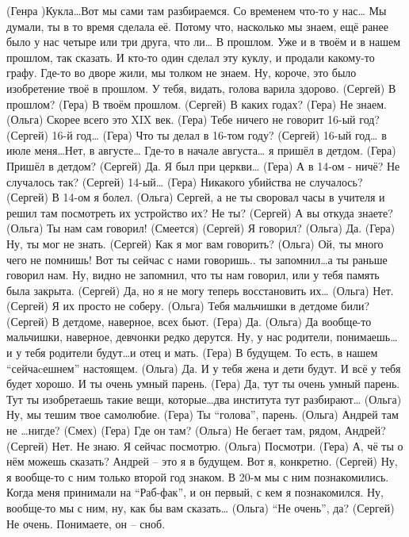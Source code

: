  (Генра )Кукла…Вот мы сами там разбираемся. Со временем что-то у нас… Мы думали, ты в то время сделала её. Потому что, насколько мы знаем, ещё ранее было у нас четыре или три друга, что ли… В прошлом. Уже и в твоём и в нашем прошлом, так сказать. И кто-то один сделал эту куклу, и продали какому-то графу. Где-то во дворе жили, мы толком не знаем. Ну, короче, это было изобретение твоё в прошлом. У тебя, видать, голова варила здорово.
 (Сергей) В прошлом?
 (Гера)   В твоём прошлом.
 (Сергей) В каких годах?
 (Гера)   Не знаем.
 (Ольга)  Скорее всего это XIX век.
 (Гера)   Тебе ничего не говорит 16-ый год?
 (Сергей) 16-й год…
 (Гера)   Что ты делал в 16-том году?
 (Сергей) 16-ый год… в июле меня…Нет, в августе… Где-то в начале августа… я пришёл в детдом.
 (Гера)   Пришёл в детдом?
 (Сергей) Да. Я был при церкви…
 (Гера)   А в 14-ом - ничё? Не случалось так? 
 (Сергей) 14-ый…
 (Гера)   Никакого убийства не случалось?
 (Сергей) В 14-ом  я болел.
 (Ольга)  Сергей, а не ты своровал часы в учителя и решил там посмотреть их устройство их? Не ты?
 (Сергей) А вы откуда знаете? 
 (Ольга)  Ты нам сам говорил! (Смеется)
 (Сергей) Я говорил?
 (Ольга)  Да.
 (Гера)   Ну, ты мог не знать.
 (Сергей) Как я мог вам говорить?
 (Ольга)  Ой, ты много чего не помнишь! Вот ты сейчас с нами говоришь.. ты запомнил…а ты раньше говорил нам. Ну, видно не запомнил, что ты нам говорил, или у тебя память была закрыта.
 (Сергей) Да, но я не могу теперь восстановить их…
 (Ольга)  Нет.
 (Сергей) Я их просто не соберу.
 (Ольга)  Тебя мальчишки в детдоме били?
 (Сергей) В детдоме,  наверное,  всех бьют. 
 (Гера)   Да.
 (Ольга)  Да вообще-то мальчишки, наверное, девчонки редко дерутся. Ну, у нас родители, понимаешь… и у тебя родители будут…и отец и мать.
 (Гера)   В будущем. То есть, в нашем ``сейчаcешнем'' настоящем.
 (Ольга)  Да. И у тебя жена и дети будут. И всё у тебя будет  хорошо. И ты очень умный парень.
 (Гера)   Да, тут ты очень умный парень. Тут ты изобретаешь такие вещи, которые…два института тут  разбирают…
 (Ольга)  Ну, мы тешим твое самолюбие.
 (Гера)   Ты ``голова'', парень.
 (Ольга)  Андрей там не …нигде?
 (Смех)
 (Гера)   Где он там?
 (Ольга)  Не бегает там, рядом, Андрей?
 (Сергей) Нет. Не знаю. Я сейчас посмотрю.
 (Ольга)  Посмотри.
 (Гера)   А, чё ты о нём можешь сказать? Андрей – это я в будущем. Вот я, конкретно.
 (Сергей) Ну, я вообще-то с ним только  второй год знаком. В 20-м мы с ним познакомились. Когда меня принимали на ``Раб-фак'', и он первый, с кем я познакомился. Ну, вообще-то мы с ним, ну, как бы вам сказать…
 (Ольга)  ``Не очень'', да?
 (Сергей)  Не очень. Понимаете, он – сноб. 

